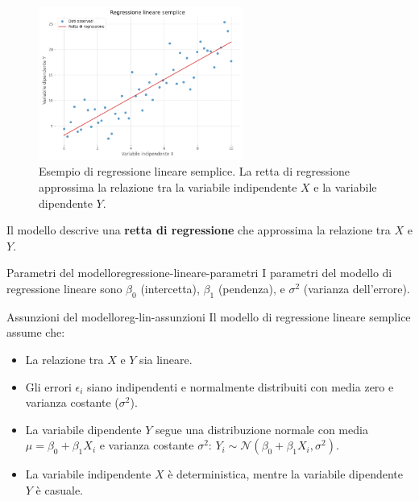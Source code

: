 \begin{figure}[H]
    \centering
    \includegraphics[width=0.6\textwidth]{images/th_16_18/regressione_lineare_semplice.png}
    \caption{Esempio di regressione lineare semplice. La retta di regressione approssima la relazione tra la variabile indipendente \( X \) e la variabile dipendente \( Y \).}
    \label{fig:regressione_lineare_semplice}
\end{figure}

Il modello descrive una \textbf{retta di regressione} che approssima la relazione tra \( X \) e \( Y \).

\begin{definizione}{Parametri del modello}{regressione-lineare-parametri}
I parametri del modello di regressione lineare sono \( \beta_0 \) (intercetta), \( \beta_1 \) (pendenza), e \( \sigma^2 \) (varianza dell'errore).
\end{definizione}

\begin{nota}{Assunzioni del modello}{reg-lin-assunzioni}
Il modello di regressione lineare semplice assume che:
\begin{itemize}
    \item La relazione tra \( X \) e \( Y \) sia lineare.
    \item Gli errori \( \epsilon_i \) siano indipendenti e normalmente distribuiti con media zero e varianza costante (\( \sigma^2 \)).
    \item La variabile dipendente \( Y \) segue una distribuzione normale con media \( \mu = \beta_0 + \beta_1 X_i \) e varianza costante \( \sigma^2 \): \( Y_i \sim \mathcal{N}(\beta_0 + \beta_1 X_i, \sigma^2) \).
    \item La variabile indipendente \( X \) è deterministica, mentre la variabile dipendente \( Y \) è casuale.
\end{itemize}
\end{nota}

